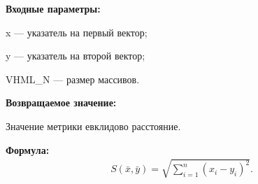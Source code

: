 \textbf{Входные параметры:}
 
x --- указатель на первый вектор;
 
y --- указатель на второй вектор;
 
VHML\_N --- размер массивов.

\textbf{Возвращаемое значение:}
 
 Значение метрики евклидово расстояние.

\textbf{Формула:}
\begin{eqnarray*}
S\left( \bar{x}, \bar{y}\right)=\sqrt{\sum_{i=1}^n {\left( x_i-y_i \right)}^2}   .
\end{eqnarray*}